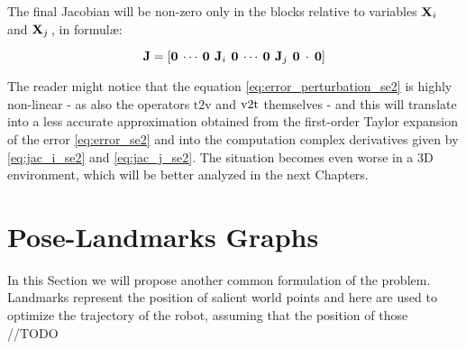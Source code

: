 \noindent The final Jacobian will be non-zero only in the blocks relative to variables $\mathbf{X}_i$ and $\mathbf{X}_j\,$, in formul\ae:

\begin{equation*}
    \mathbf{J} = \left[\mathbf{0} \: \cdots \: \mathbf{0} \:\, \mathbf{J}_i \,\: \mathbf{0} \: \cdots \: \mathbf{0} \:\, \mathbf{J}_j \,\: \mathbf{0} \: \cdot \: \mathbf{0}\right]
\end{equation*}

The reader might notice that the equation \ref{eq:error_perturbation_se2} is highly non-linear - as also the operators $\text{t2v}$ and $\v2t$ themselves - and this will translate into a less accurate approximation obtained from the first-order Taylor expansion of the error \ref{eq:error_se2} and into the computation complex derivatives given by \ref{eq:jac_i_se2} and \ref{eq:jac_j_se2}. The situation becomes even worse in a 3D environment, which will be better analyzed in the next Chapters. 

\section{Pose-Landmarks Graphs}\label{sec:pose_land_graph}
In this Section we will propose another common formulation of the problem. Landmarks represent the position of salient world points and here are used to optimize the trajectory of the robot, assuming that the position of those //TODO

